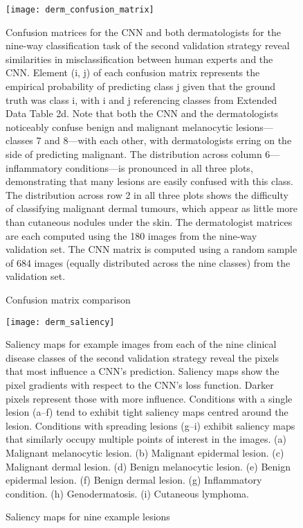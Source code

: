\begin{figure}
\texttt{[image: derm\_confusion\_matrix]}
\caption{Confusion matrix comparison}
\vspace{12px}
Confusion matrices for the CNN and both dermatologists for the nine-way classification task of the second validation strategy reveal similarities in misclassification between human experts and the CNN. Element (i, j) of each confusion matrix represents the empirical probability of predicting class j given that the ground truth was class i, with i and j referencing classes from Extended Data Table 2d. Note that both the CNN and the dermatologists noticeably confuse benign and malignant melanocytic lesions—classes 7 and 8—with each other, with dermatologists erring on the side of predicting malignant. The distribution across column 6—inflammatory conditions—is pronounced in all three plots, demonstrating that many lesions are easily confused with this class. The distribution across row 2 in all three plots shows the difficulty of classifying malignant dermal tumours, which appear as little more than cutaneous nodules under the skin. The dermatologist matrices are each computed using the 180 images from the nine-way validation set. The CNN matrix is computed using a random sample of 684 images (equally distributed across the nine classes) from the validation set.
\label{fig:derm_confusion_matrix}
\end{figure}

\begin{figure}
\texttt{[image: derm\_saliency]}
\caption{Saliency maps for nine example lesions}
\vspace{12px}
Saliency maps for example images from each of the nine clinical disease classes of the second validation strategy reveal the pixels that most influence a CNN’s prediction. Saliency maps show the pixel gradients with respect to the CNN’s loss function. Darker pixels represent those with more influence. Conditions with a single lesion (a–f) tend to exhibit tight saliency maps centred around the lesion. Conditions with spreading lesions (g–i) exhibit saliency maps that similarly occupy multiple points of interest in the images. (a) Malignant melanocytic lesion. (b) Malignant epidermal lesion. (c) Malignant dermal lesion. (d) Benign melanocytic lesion. (e) Benign epidermal lesion. (f) Benign dermal lesion. (g) Inflammatory condition. (h) Genodermatosis. (i) Cutaneous lymphoma.
\label{fig:derm_saliency}
\end{figure}

